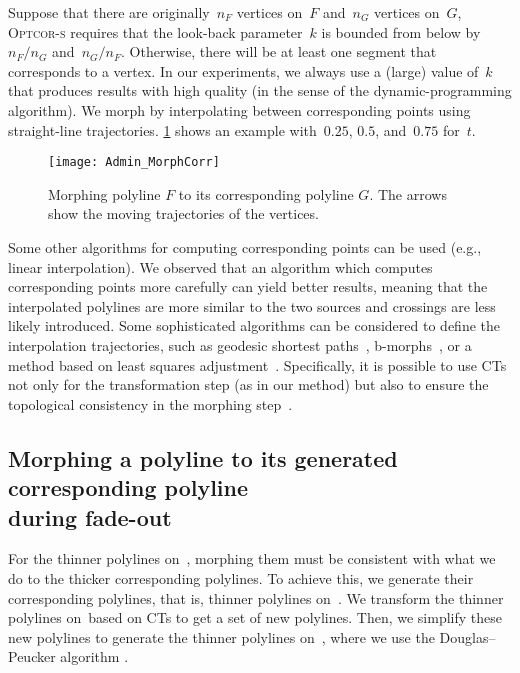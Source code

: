 Suppose that there are originally~$n_F$ vertices on~$F$ 
and~$n_G$ vertices on~$G$,
\textsc{Optcor-s} requires that 
the look-back parameter~$k$ is bounded from below 
by~$n_F/n_G$ and~$n_G/n_F$. 
Otherwise, there will be at least one segment 
that corresponds to a vertex. 
In our experiments, we always use a (large) value of~$k$ 
that produces results with high quality 
(in the sense of the dynamic-programming algorithm). 
We morph by interpolating between corresponding points using
straight-line trajectories. 
\fig\ref{fig:Admin_MorphCorr} shows an example
with~$0.25$, $0.5$, and~$0.75$ for~$t$.

\begin{figure}[tb]
	\centering
	\texttt{[image: Admin\_MorphCorr]}
	\caption{Morphing polyline $F$ to its corresponding 
	polyline $G$. 
	The arrows show the moving trajectories of the vertices.}
	\label{fig:Admin_MorphCorr}
\end{figure}

Some other algorithms for computing corresponding points 
can be used (e.g., linear interpolation). 
We observed that an algorithm which
computes corresponding points more carefully 
can yield better results, 
meaning that the interpolated polylines 
are more similar to the two sources and
crossings are less likely introduced.
Some sophisticated algorithms can be 
considered to define the interpolation trajectories, 
such as geodesic shortest paths~\parencite{Bereg2005}, 
b-morphs~\parencite{Whited2011BallMorph}, 
or a method based on 
least squares adjustment~\parencite{Peng2013LSA}. 
Specifically, it is possible to use CTs
not only for the transformation step (as in our method) 
but also to ensure the topological consistency in the morphing step~\parencite{GotsmanS2001,Surazhsky2003Intrinsic,Surazhsky2004HighQuality}.

\subsection[Morphing a polyline to 
its generated corresponding polyline] 
{Morphing a polyline to 
its generated corresponding polyline \\ during fade-out}
\label{sec:Admin_MorphSinglePolylines}

For the thinner polylines on~\ml, 
morphing them must be consistent with 
what we do to the thicker corresponding polylines. 
To achieve this, we generate their corresponding polylines, that is, thinner polylines on~\ms. 
We transform the thinner polylines on~\ml based on CTs
to get a set of new polylines.
Then, we simplify these new polylines 
to generate the thinner polylines on~\ms,
where we use the Douglas--Peucker algorithm
\parencite{Douglas1973}.

